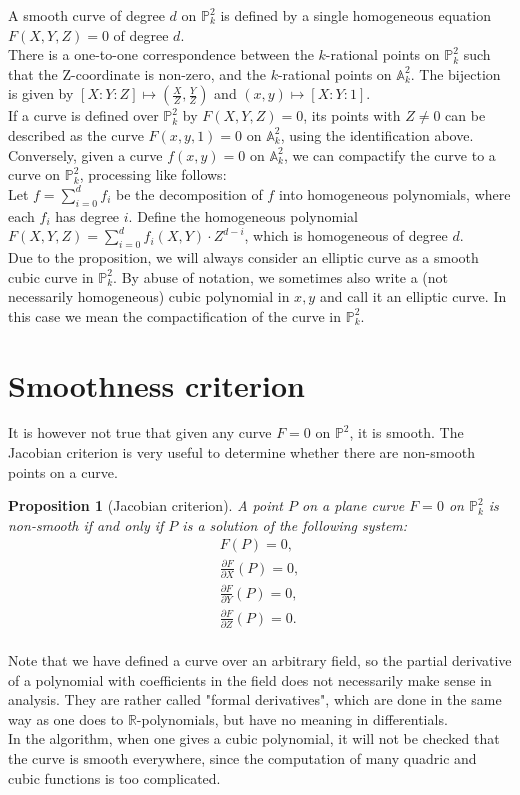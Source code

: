 \documentclass[a4paper,oneside,11pt]{article}
\newcommand{\bA}{\mathbb{A}}
\newcommand{\bP}{\mathbb{P}}
\newcommand{\bR}{\mathbb{R}}
\newtheorem{prop}[thm]{Proposition}
\theoremstyle{definition}
\begin{document}
A smooth curve of degree $d$ on $\bP^2_k$ is defined by a single homogeneous equation $F(X,Y,Z)=0$ of degree $d$. \\
There is a one-to-one correspondence between the $k$-rational points on $\bP^2_k$ such that the Z-coordinate is non-zero, and the $k$-rational points on $\bA^2_k$. The bijection is given by $[X:Y:Z]\mapsto (\frac{X}{Z}, \frac{Y}{Z})$ and $(x,y) \mapsto [X:Y:1]$.\\
If a curve is defined over $\bP^2_k$ by $F(X,Y,Z)=0$, its points with $Z\neq 0$ can be described as the curve $F(x,y,1)=0$ on $\bA^2_k$, using the identification above. Conversely, given a curve $f(x,y)=0$ on $\bA^2_k$, we can compactify the curve to a curve on $\bP^2_k$, processing like follows:\\
Let $f=\sum_{i=0}^d f_i$ be the decomposition of $f$ into homogeneous polynomials, where each $f_i$ has degree $i$. Define the homogeneous polynomial $F(X,Y,Z)=\sum_{i=0}^d f_i(X,Y)\cdot Z^{d-i}$, which is homogeneous of degree $d$.\\
Due to the proposition, we will always consider an elliptic curve as a smooth cubic curve in $\bP^2_k$. By abuse of notation, we sometimes also write a (not necessarily homogeneous) cubic polynomial in $x,y$ and call it an elliptic curve. In this case we mean the compactification of the curve in $\bP^2_k$.

\section{Smoothness criterion}
It is however not true that given any curve $F=0$ on $\bP^2$, it is smooth. The Jacobian criterion is very useful to determine whether there are non-smooth points on a curve.
\begin{prop}[Jacobian criterion]
	A point $P$ on a plane curve $F=0$ on $\bP^2_k$ is non-smooth if and only if $P$ is a solution of the following system:
	\begin{align*}
		F(P)=0,\\
		\frac{\partial F}{\partial X}(P)=0,\\
		\frac{\partial F}{\partial Y}(P)=0,\\
		\frac{\partial F}{\partial Z}(P)=0.\\
	\end{align*}
\end{prop}
Note that we have defined a curve over an arbitrary field, so the partial derivative of a polynomial with coefficients in the field does not necessarily make sense in analysis. They are rather called "formal derivatives", which are done in the same way as one does to $\bR$-polynomials, but have no meaning in differentials.\\
In the algorithm, when one gives a cubic polynomial, it will not be checked that the curve is smooth everywhere, since the computation of many quadric and cubic functions is too complicated.
\end{document}
